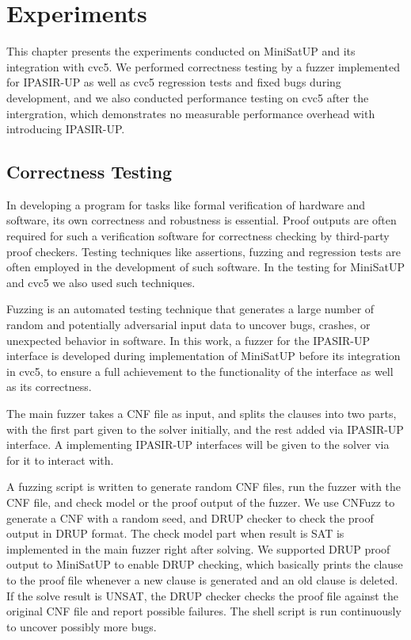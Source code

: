 \chapter{Experiments}

This chapter presents the experiments conducted on MiniSatUP and its integration with cvc5. We performed correctness testing by a fuzzer implemented for IPASIR-UP as well as cvc5 regression tests and fixed bugs during development, and we also conducted performance testing on cvc5 after the intergration, which demonstrates no measurable performance overhead with introducing IPASIR-UP.

\section{Correctness Testing}

In developing a program for tasks like formal verification of hardware and software, its own correctness and robustness is essential. Proof outputs are often required for such a verification software for correctness checking by third-party proof checkers. Testing techniques like assertions, fuzzing and regression tests are often employed in the development of such software. In the testing for MiniSatUP and cvc5 we also used such techniques.

Fuzzing is an automated testing technique that generates a large number of random and potentially adversarial input data to uncover bugs, crashes, or unexpected behavior in software. In this work, a fuzzer for the IPASIR-UP interface is developed during implementation of MiniSatUP before its integration in cvc5, to ensure a full achievement to the functionality of the interface as well as its correctness.

The main fuzzer takes a CNF file as input, and splits the clauses into two parts, with the first part given to the solver initially, and the rest added via IPASIR-UP interface. A  implementing IPASIR-UP interfaces will be given to the solver via  for it to interact with.

A fuzzing script is written to generate random CNF files, run the fuzzer with the CNF file, and check model or the proof output of the fuzzer. We use CNFuzz \cite{BrummayerLonsingBiere-SAT10} to generate a CNF with a random seed, and DRUP checker \cite{6679408} to check the proof output in DRUP format. The check model part when result is SAT is implemented in the main fuzzer right after solving. We supported DRUP proof output to MiniSatUP to enable DRUP checking, which basically prints the clause to the proof file whenever a new clause is generated and an old clause is deleted. If the solve result is UNSAT, the DRUP checker checks the proof file against the original CNF file and report possible failures. The shell script is run continuously to uncover possibly more bugs.

